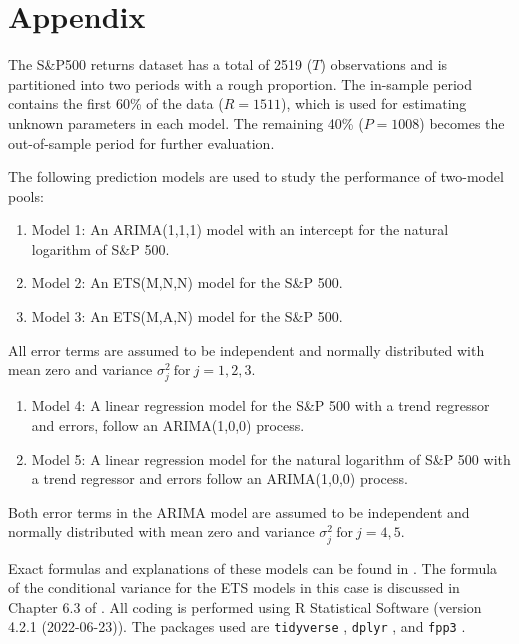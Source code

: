 \documentclass{monashthesis}
\begin{document}
\appendix

\hypertarget{appendix}{%
\chapter{Appendix}\label{appendix}}

The S\&P500 returns dataset has a total of 2519 (\(T\)) observations and is partitioned into two periods with a rough proportion. The in-sample period contains the first 60\% of the data (\(R = 1511\)), which is used for estimating unknown parameters in each model. The remaining 40\% (\(P = 1008\)) becomes the out-of-sample period for further evaluation.

The following prediction models are used to study the performance of two-model pools:

\begin{enumerate}
\def\labelenumi{\arabic{enumi}.}
\tightlist
\item
  Model 1: An ARIMA(1,1,1) model with an intercept for the natural logarithm of S\&P 500.
\item
  Model 2: An ETS(M,N,N) model for the S\&P 500.
\item
  Model 3: An ETS(M,A,N) model for the S\&P 500.
\end{enumerate}

All error terms are assumed to be independent and normally distributed with mean zero and variance \(\sigma_j^2 \ \text{for}\  j = 1,2,3\).

\begin{enumerate}
\def\labelenumi{\arabic{enumi}.}
\setcounter{enumi}{3}
\tightlist
\item
  Model 4: A linear regression model for the S\&P 500 with a trend regressor and errors, follow an ARIMA(1,0,0) process.
\item
  Model 5: A linear regression model for the natural logarithm of S\&P 500 with a trend regressor and errors follow an ARIMA(1,0,0) process.
\end{enumerate}

Both error terms in the ARIMA model are assumed to be independent and normally distributed with mean zero and variance \(\sigma_j^2 \ \text{for}\  j = 4,5\).

Exact formulas and explanations of these models can be found in \textcite{fpp3}. The formula of the conditional variance for the ETS models in this case is discussed in Chapter 6.3 of \textcite{HKOS08}. All coding is performed using R Statistical Software (version 4.2.1 (2022-06-23)). The packages used are \texttt{tidyverse} \autocite{tidy19}, \texttt{dplyr} \autocite{dplyr23}, and \texttt{fpp3} \autocite{fpp23}.
\end{document}
